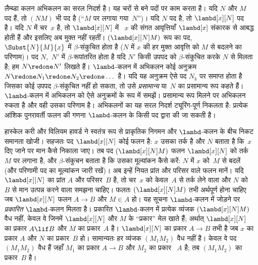 \documentclass[../../../include/open-logic-section]{subfiles}
\begin{document}


लैम्ब्डा कलन अभिकलन का सरल निदर्श है। यह चरों से बने पदों पर काम करता है। यदि
$N$ और $M$ पद हैं, तो $(NM)$ भी पद है (``$M$ पर लगाया गया~$N$'')। यदि $N$ पद
है, तो $\lambd[x][N]$ पद है। यदि $N$ में चर~$x$ है, तो $\lambd[x][N]$ में
~$x$ की संगत आवृत्तियाँ $\lambd[x]$ संकारक से आबद्ध होती हैं और इसलिए अब
मुक्त नहीं रहतीं। $(\lambd[x][N]M)$ रूप का पद, $\Subst{N}{M}{x}$ में
$\beta$-संकुचित होता है ($N$ में $x$ की हर मुक्त आवृत्ति को $M$ से बदलने का
परिणाम)। पद $N$,~$N'$ में $\beta$-रूपांतरित होता है यदि $N'$ किसी उपपद को
$\beta$-संकुचित करके $N$ से मिलता है; हम $N \redone N'$ लिखते हैं।
$\lambd$-कलन में अभिकलन कोई अनुक्रम $N \redone N_1 \redone N_2 \redone
\dots$ है। यदि यह अनुक्रम ऐसे पद $N_k$ पर समाप्त होता है जिसका कोई उपपद
$\beta$-संकुचित नहीं हो सकता, तो उसे \emph{प्रसामान्य} या~$N$ का प्रसामान्य
रूप कहते हैं। $\lambd$-कलन में अभिकलन को ऐसे अनुक्रमों के रूप में समझें।
प्रसामान्य रूप मिलने पर अभिकलन रुकता है और वही उसका परिणाम है। अभिकलनों का यह
सरल निदर्श ट्यूरिंग-पूर्ण निकलता है: प्रत्येक आंशिक पुनरावर्ती फलन की गणना
$\lambd$-कलन के किसी पद द्वारा की जा सकती है।

हास्केल करी और विलियम हावर्ड ने स्वतंत्र रूप से प्राकृतिक निगमन और
$\lambd$-कलन के बीच निकट समानता खोजी। सहजतः पद $\lambd[x][N]$ कोई फलन है:
$x$ उसका तर्क है और $N$ बताता है कि~$x$ दिए जाने पर मान कैसे निकाला जाए। तब
पद $(\lambd[x][N]M)$ फलन $\lambd[x][N]$ को तर्क~$M$ पर लगाना है, और
$\beta$-संकुचन बताता है कि उसका मूल्यांकन कैसे करें: $N$ में $x$ को~$M$ से
बदलें (और परिणामी पद का मूल्यांकन जारी रखें)। अब इन्हें नियत प्रांत और परिसर
वाले फलन मानें। यदि $\lambd[x][N]$ का प्रांत $A$ और परिसर~$B$ है, तो चर~$x$
को केवल~$A$ से तर्क लेने वाला और $N$ को~$B$ से मान उत्पन्न करने वाला समझना
चाहिए। फलतः $(\lambd[x][N]M)$ तभी अर्थपूर्ण होना चाहिए जब $\lambd[x][N]$
फलन $A \to B$ और $M \in A$ हो। यह सूचना $\lambd$-कलन में जोड़ने पर
\emph{प्रकारित} $\lambd$-कलन मिलता है। प्रकारित $\lambd$-कलन में प्रत्येक
व्यंजक $(\lambd[x][N]M)$ वैध नहीं, केवल वे जिनमें $\lambd[x][N]$ और $M$ के
``प्रकार'' मेल खाते हैं; अर्थात् $\lambd[x][N]$ का प्रकार $A \lif B$ और $M$
का प्रकार~$A$ है। $\lambd[x][N]$ का प्रकार $A \to B$ तभी है जब $x$ का प्रकार
$A$ और $N$ का प्रकार~$B$ हो। सामान्यतः हर व्यंजक $(M_1M_2)$ वैध नहीं है। केवल
वे पद $(M_1M_2)$ वैध हैं जहाँ $M_1$ का प्रकार $A \to B$ और $M_2$ का प्रकार
~$A$ है; तब $(M_1M_2)$ का प्रकार~$B$ है।
\end{document}
